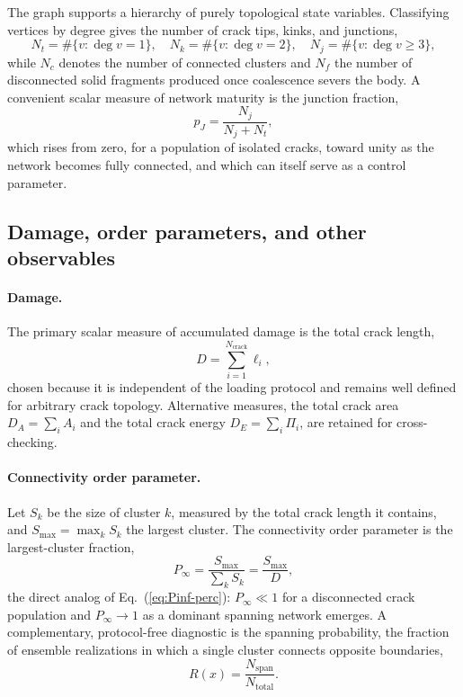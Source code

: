 \documentclass[preprint,12pt]{elsarticle}
\begin{document}
The graph supports a hierarchy of purely topological state variables. Classifying
vertices by degree gives the number of crack tips, kinks, and junctions,
\begin{equation}
N_t = \#\{v: \deg v = 1\}, \quad
N_k = \#\{v: \deg v = 2\}, \quad
N_j = \#\{v: \deg v \ge 3\},
\label{eq:topology}
\end{equation}
while $N_c$ denotes the number of connected clusters and $N_f$ the number of
disconnected solid fragments produced once coalescence severs the body. A convenient
scalar measure of network maturity is the junction fraction,
\begin{equation}
p_J = \frac{N_j}{N_j + N_t},
\label{eq:pj}
\end{equation}
which rises from zero, for a population of isolated cracks, toward unity as the
network becomes fully connected, and which can itself serve as a control parameter.

\subsection{Damage, order parameters, and other observables}
\label{sec:observables}

\paragraph{Damage.}
The primary scalar measure of accumulated damage is the total crack length,
\begin{equation}
D = \sum_{i=1}^{N_{\mathrm{crack}}} \ell_i,
\label{eq:damage}
\end{equation}
chosen because it is independent of the loading protocol and remains well defined for
arbitrary crack topology. Alternative measures, the total crack area
$D_A=\sum_i A_i$ and the total crack energy $D_E=\sum_i \Pi_i$, are retained for
cross-checking.

\paragraph{Connectivity order parameter.}
Let $S_k$ be the size of cluster $k$, measured by the total crack length it contains,
and $S_{\max}=\max_k S_k$ the largest cluster. The connectivity order parameter is the
largest-cluster fraction,
\begin{equation}
P_\infty = \frac{S_{\max}}{\sum_k S_k} = \frac{S_{\max}}{D},
\label{eq:Pinf-vcem}
\end{equation}
the direct analog of Eq.~(\ref{eq:Pinf-perc}): $P_\infty \ll 1$ for a disconnected
crack population and $P_\infty \to 1$ as a dominant spanning network emerges. A
complementary, protocol-free diagnostic is the spanning probability, the fraction of
ensemble realizations in which a single cluster connects opposite boundaries,
\begin{equation}
R(x) = \frac{N_{\mathrm{span}}}{N_{\mathrm{total}}}.
\label{eq:spanning}
\end{equation}
\end{document}
